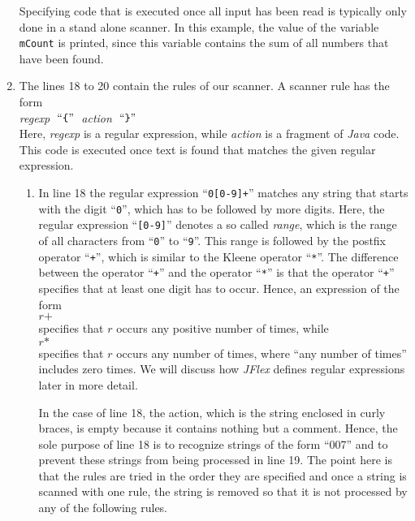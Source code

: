 \begin{enumerate}
      Specifying code that is executed once all input has been read is typically only done in a 
      stand alone scanner.  In this example, the value of the variable \texttt{mCount} is printed,
      since this variable contains the sum of all numbers that have been found.
\item The lines 18 to 20 contain the rules of our scanner.  A scanner rule has the form
      \\[0.2cm]
      \hspace*{1.3cm}
      \textsl{regexp} $\;\mbox{``\texttt{\{}''}\;$ \textsl{action} $\;\mbox{``\texttt{\}}''}\;$
      \\[0.2cm]
      Here, \textsl{regexp} is a regular expression, while \textsl{action} is a fragment of 
      \textsl{Java} code.  This code is executed once text is found that matches the given regular
      expression.
      \begin{enumerate}
      \item In line 18 the regular expression  ``\texttt{0[0-9]+}'' matches any string that starts
            with the digit ``\texttt{0}'', which has to be followed by more digits.
            Here, the regular expression ``\texttt{[0-9]}'' denotes a so called \emph{range}, which
            is the range of all characters from ``\texttt{0}'' to ``\texttt{9}''.
            This range is followed by the postfix operator ``\texttt{+}'', which is similar to the
            Kleene operator ``\texttt{*}''.  The difference between the operator ``\texttt{+}''
            and the operator ``\texttt{*}'' is that the operator ``\texttt{+}'' specifies that at
            least one digit has to occur.  Hence, an expression of the form
            \\[0.2cm]
            \hspace*{1.3cm}
            $r\mathtt{+}$
            \\[0.2cm]
            specifies that $r$ occurs any positive number of times, while
            \\[0.2cm]
            \hspace*{1.3cm}
            $r\mathtt{*}$
            \\[0.2cm]
            specifies that $r$ occurs any number of times, where ``any number of times'' includes
            zero times. We will discuss how \textsl{JFlex} defines regular expressions later in more detail.
 
            In the case of line 18, the action, which is the string enclosed in curly braces, is
            empty because it contains nothing but a comment.  Hence, the sole purpose of line 18 is
            to recognize strings of the form ``007'' and to prevent these strings from being
            processed in line 19.  The point here is that the rules are tried in the order they are
            specified and once a string is scanned with one rule, the string is removed so that it
            is not processed by any of the following rules.


\end{enumerate}
\end{enumerate}
